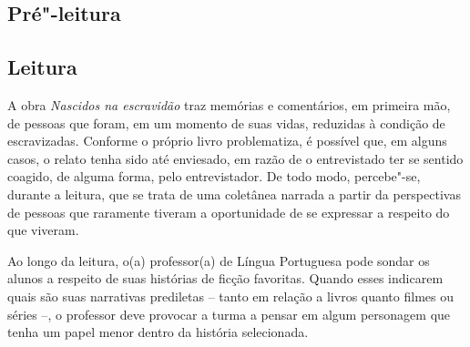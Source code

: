 \documentclass[11pt]{extarticle}
\begin{document}




\subsection{Pré"-leitura}


\subsection{Leitura}


A obra \emph{Nascidos na escravidão} traz memórias e
comentários, em primeira mão, de pessoas que foram, em um momento de
suas vidas, reduzidas à condição de escravizadas. Conforme o próprio
livro problematiza, é possível que, em alguns casos, o relato tenha sido
até enviesado, em razão de o entrevistado ter se sentido coagido, de
alguma forma, pelo entrevistador. De todo modo, percebe"-se, durante a
leitura, que se trata de uma coletânea narrada a partir da perspectivas
de pessoas que raramente tiveram a oportunidade de se expressar a
respeito do que viveram.


Ao longo da leitura, o(a) professor(a) de Língua Portuguesa pode sondar
os alunos a respeito de suas histórias de ficção favoritas. Quando esses
indicarem quais são suas narrativas prediletas -- tanto em relação a
livros quanto filmes ou séries --, o professor deve provocar a turma a
pensar em algum personagem que tenha um papel menor dentro da história
selecionada.
\end{document}
